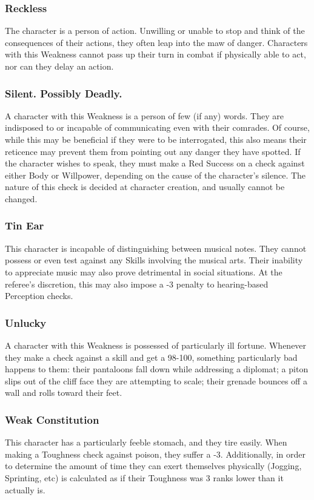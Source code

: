 \documentclass[oneside]{book}
\begin{document}
\begin{multicols}{2}
\subsubsection{Reckless}
The character is a person of action. Unwilling or unable to stop and think of the consequences of their actions, they often leap into the maw of danger. Characters with this Weakness cannot pass up their turn in combat if physically able to act, nor can they delay an action. 

\subsubsection{Silent. Possibly Deadly.}
A character with this Weakness is a person of few (if any) words. They are indisposed to or incapable of communicating even with their comrades. Of course, while this may be beneficial if they were to be interrogated, this also means their reticence may prevent them from pointing out any danger they have spotted. If the character wishes to speak, they must make a Red Success on a check against either Body or Willpower, depending on the cause of the character's silence. The nature of this check is decided at character creation, and usually cannot be changed. 

\subsubsection{Tin Ear}
This character is incapable of distinguishing between musical notes. They cannot possess or even test against any Skills involving the musical arts. Their inability to appreciate music may also prove detrimental in social situations. At the referee's discretion, this may also impose a -3 penalty to hearing-based Perception checks.

\subsubsection{Unlucky}
A character with this Weakness is possessed of particularly ill fortune. Whenever they make a check against a skill and get a 98-100, something particularly bad happens to them: their pantaloons fall down while addressing a diplomat; a piton slips out of the cliff face they are attempting to scale; their grenade bounces off a wall and rolls toward their feet. 

\subsubsection{Weak Constitution}
This character has a particularly feeble stomach, and they tire easily. When making a Toughness check against poison, they suffer a -3. Additionally, in order to determine the amount of time they can exert themselves physically (Jogging, Sprinting, etc) is calculated as if their Toughness was 3 ranks lower than it actually is.


\end{multicols}
\end{document}

